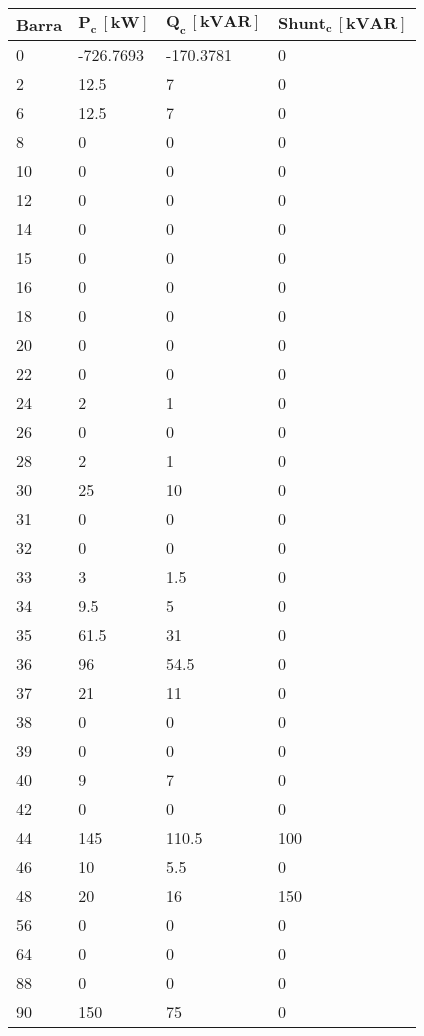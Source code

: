 \begin{tabular}{llll}
\toprule
\textbf{Barra}&\textbf{$\mathbf{P_c\,[kW]}$}&\textbf{$\mathbf{Q_c\,[kVAR]}$}&\textbf{$\mathbf{Shunt_c\,[kVAR]}$}\\
\midrule
0&-726.7693&-170.3781&0\\
2&12.5&7&0\\
6&12.5&7&0\\
8&0&0&0\\
10&0&0&0\\
12&0&0&0\\
14&0&0&0\\
15&0&0&0\\
16&0&0&0\\
18&0&0&0\\
20&0&0&0\\
22&0&0&0\\
24&2&1&0\\
26&0&0&0\\
28&2&1&0\\
30&25&10&0\\
31&0&0&0\\
32&0&0&0\\
33&3&1.5&0\\
34&9.5&5&0\\
35&61.5&31&0\\
36&96&54.5&0\\
37&21&11&0\\
38&0&0&0\\
39&0&0&0\\
40&9&7&0\\
42&0&0&0\\
44&145&110.5&100\\
46&10&5.5&0\\
48&20&16&150\\
56&0&0&0\\
64&0&0&0\\
88&0&0&0\\
90&150&75&0\\
\bottomrule
\end{tabular}
